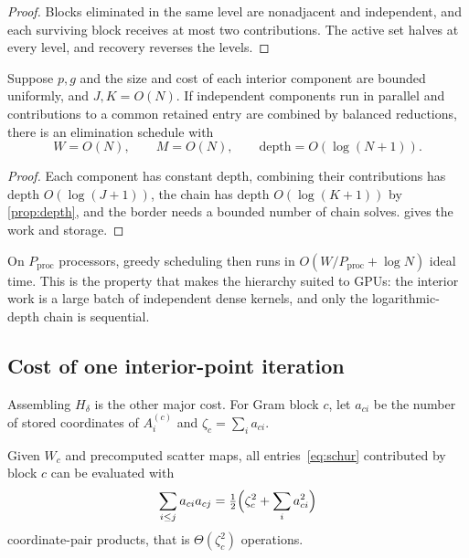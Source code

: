 \begin{proof}
Blocks eliminated in the same level are nonadjacent and independent, and each
surviving block receives at most two contributions. The active set halves at every
level, and recovery reverses the levels.
\end{proof}

\begin{corollary}\label{cor:depth}
Suppose $p,g$ and the size and cost of each interior component are bounded
uniformly, and $J,K=O(N)$. If independent components run in parallel and
contributions to a common retained entry are combined by balanced reductions, there
is an elimination schedule with
\begin{equation}\label{eq:depth}
W=O(N),\qquad M=O(N),\qquad \text{depth}=O(\log(N+1)).
\end{equation}
\end{corollary}

\begin{proof}
Each component has constant depth, combining their contributions has depth
$O(\log(J+1))$, the chain has depth $O(\log(K+1))$ by \cref{prop:depth}, and the
border needs a bounded number of chain solves.  gives the work and
storage.
\end{proof}

On $P_{\mathrm{proc}}$ processors, greedy scheduling then runs in
$O(W/P_{\mathrm{proc}}+\log N)$ ideal time. This is the property that makes the
hierarchy suited to GPUs: the interior work is a large batch of independent dense
kernels, and only the logarithmic-depth chain is sequential.

\subsection{Cost of one interior-point iteration}\label{sec:iter-cost}

Assembling $H_\delta$ is the other major cost. For Gram block $c$, let $a_{ci}$ be
the number of stored coordinates of $A_i^{(c)}$ and $\zeta_c=\sum_ia_{ci}$.

\begin{proposition}\label{prop:selector}
Given $W_c$ and precomputed scatter maps, all entries~\eqref{eq:schur} contributed
by block $c$ can be evaluated with
\begin{equation}\label{eq:selector}
\sum_{i\le j}a_{ci}a_{cj}=\tfrac12\Bigl(\zeta_c^2+\sum_ia_{ci}^2\Bigr)
\end{equation}
coordinate-pair products, that is $\Theta(\zeta_c^2)$ operations.
\end{proposition}

